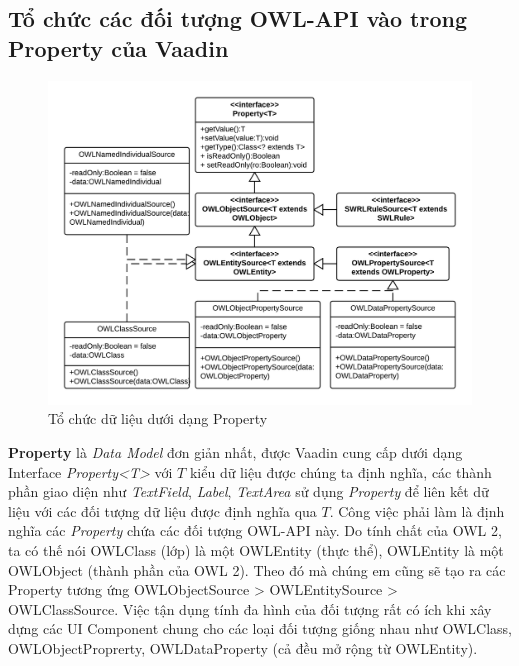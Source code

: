 {\subsection{Tổ chức các đối tượng OWL-API vào trong Property của Vaadin}
\begin{figure}[h!]
 	\centering
 	\includegraphics[width=150mm]{Figures/uml_owleditor_owlobjectsource.png}
 	\caption{Tổ chức dữ liệu dưới dạng Property \label{overflow}}
\end{figure}
\textbf{Property} là \textit{Data Model} đơn giản nhất, được Vaadin cung cấp dưới dạng Interface \textit{Property<T>} với $T$ kiểu dữ liệu được chúng ta định nghĩa, các thành phần giao diện như \textit{TextField}, \textit{Label}, \textit{TextArea} sử dụng \textit{Property} để liên kết dữ liệu với các đối tượng dữ liệu được định nghĩa qua $T$. Công việc phải làm là định nghĩa các \textit{Property} chứa các đối tượng OWL-API này. Do tính chất của OWL 2, ta có thế nói OWLClass (lớp) là một OWLEntity (thực thể), OWLEntity là một OWLObject (thành phần của OWL 2). Theo đó mà chúng em cũng sẽ tạo ra các Property tương ứng OWLObjectSource > OWLEntitySource > OWLClassSource. Việc tận dụng tính đa hình của đối tượng rất có ích khi xây dựng các UI Component chung cho các loại đối tượng giống nhau như OWLClass, OWLObjectProprerty, OWLDataProperty (cả đều mở rộng từ OWLEntity). 
}
